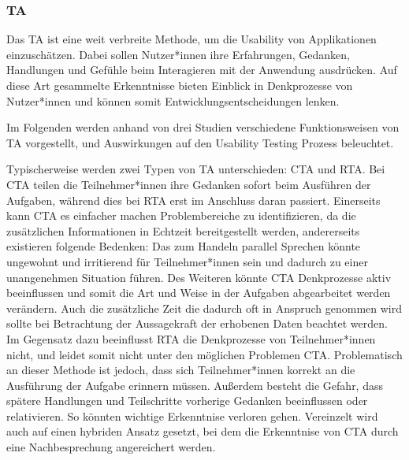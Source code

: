 \cite{barnumUsabilityTesting2021}

\subsubsection{\acl{TA}}
Das \ac{TA} ist eine weit verbreite Methode, um die Usability von Applikationen einzuschätzen. Dabei sollen Nutzer*innen ihre Erfahrungen, Gedanken, Handlungen und Gefühle beim Interagieren mit der Anwendung ausdrücken. Auf diese Art gesammelte Erkenntnisse  bieten Einblick in Denkprozesse von Nutzer*innen und können somit Entwicklungsentscheidungen lenken. \cite{alhadretiRethinkingThinking2018}

Im Folgenden werden anhand von drei Studien verschiedene Funktionsweisen von \ac{TA} vorgestellt, und Auswirkungen auf den Usability Testing Prozess beleuchtet.

Typischerweise werden zwei Typen von \ac{TA} unterschieden: \ac{CTA} und \ac{RTA}. Bei \ac{CTA} teilen die Teilnehmer*innen ihre Gedanken sofort beim Ausführen der Aufgaben, während dies bei \ac{RTA} erst im Anschluss daran passiert. Einerseits kann \ac{CTA} es einfacher machen Problembereiche zu identifizieren, da die zusätzlichen Informationen in Echtzeit bereitgestellt werden, andererseits existieren folgende Bedenken: Das zum Handeln parallel Sprechen könnte ungewohnt und irritierend für Teilnehmer*innen sein und dadurch zu einer unangenehmen Situation führen. Des Weiteren könnte \ac{CTA} Denkprozesse aktiv beeinflussen und somit die Art und Weise in der Aufgaben abgearbeitet werden verändern. Auch die zusätzliche Zeit die dadurch oft in Anspruch genommen wird sollte bei Betrachtung der Aussagekraft der erhobenen Daten beachtet werden.  Im Gegensatz dazu beeinflusst \ac{RTA} die Denkprozesse von Teilnehmer*innen nicht, und leidet somit nicht unter den möglichen Problemen \ac{CTA}. Problematisch an dieser Methode ist jedoch, dass sich Teilnehmer*innen korrekt an die Ausführung der Aufgabe erinnern müssen. Außerdem besteht die Gefahr, dass spätere Handlungen und Teilschritte vorherige Gedanken beeinflussen oder relativieren. So könnten wichtige Erkenntnise verloren gehen. Vereinzelt wird auch auf einen hybriden Ansatz gesetzt, bei dem die Erkenntnise von \ac{CTA} durch eine Nachbesprechung angereichert werden. \cite{alhadretiRethinkingThinking2018}

